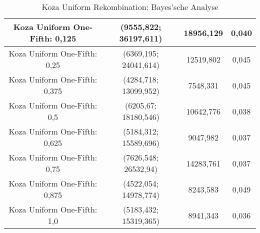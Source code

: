 \begin{table}[H]
\begin{tabular}{c | c | c | c}
		\hline
		\hline
		Koza Uniform One-Fifth: 0,125 & (\color{red}9555,822\color{black}; \color{red}36197,611\color{black}) & \color{red}18956,129\color{black} & 0,040\\
		\hline
		Koza Uniform One-Fifth: 0,25 & (6369,195; 24041,614) & 12519,802 & 0,045\\
		\hline
		Koza Uniform One-Fifth: 0,375 & (4284,718; 13099,952) & 7548,331 & 0,045\\
		\hline
		Koza Uniform One-Fifth: 0,5 & (6205,67; 18180,546) & 10642,776 & 0,038\\
		\hline
		Koza Uniform One-Fifth: 0,625 & (5184,312; 15589,696) & 9047,982 & 0,037\\
		\hline
		Koza Uniform One-Fifth: 0,75 & (7626,548; 26532,94) & 14283,761 & \color{red}0,037\color{black}\\
		\hline
		Koza Uniform One-Fifth: 0,875 & (4522,054; 14978,774) & 8243,583 & 0,049\\
		\hline
		Koza Uniform One-Fifth: 1,0 & (5183,432; 15319,365) & 8941,343 & \color{red}0,036\color{black}\\
	\end{tabular}
	\caption{Koza Uniform Rekombination: Bayes'sche Analyse}
	\label{table:kozaUniformBayesian}
\end{table} 


